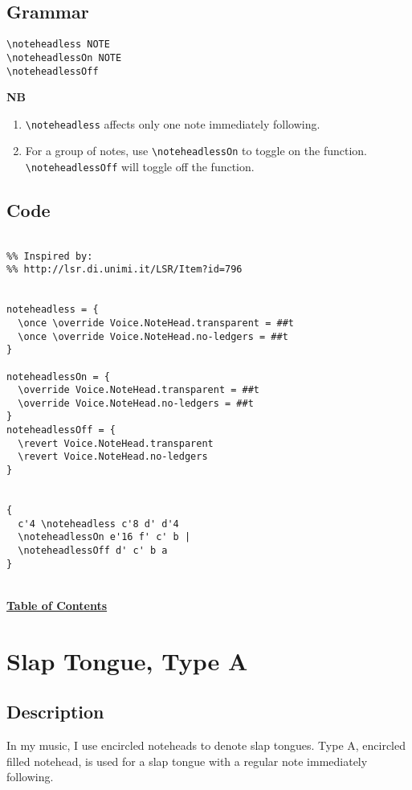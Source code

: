 \subsection{Grammar}
\begin{verbatim}
\noteheadless NOTE
\noteheadlessOn NOTE 
\noteheadlessOff
\end{verbatim}

\textbf{NB} 
\begin{enumerate} 
\item \verb|\noteheadless| affects only one note immediately following. 
\item For a group of notes, use \verb|\noteheadlessOn| to toggle on the function.  \verb|\noteheadlessOff| will toggle off the function.
\end{enumerate}

\subsection{Code}
\begin{verbatim}

%% Inspired by:
%% http://lsr.di.unimi.it/LSR/Item?id=796


noteheadless = {
  \once \override Voice.NoteHead.transparent = ##t
  \once \override Voice.NoteHead.no-ledgers = ##t
}

noteheadlessOn = {
  \override Voice.NoteHead.transparent = ##t
  \override Voice.NoteHead.no-ledgers = ##t
}
noteheadlessOff = {
  \revert Voice.NoteHead.transparent
  \revert Voice.NoteHead.no-ledgers
}


{
  c'4 \noteheadless c'8 d' d'4
  \noteheadlessOn e'16 f' c' b |
  \noteheadlessOff d' c' b a
}

\end{verbatim}
\hyperref[sec:toc]{\\ \textbf{Table of Contents}}

\vfill \break


\section {Slap Tongue, Type A}
\hfill

\subsection{Description}
	In my music, I use encircled noteheads to denote slap tongues. Type A, encircled filled notehead, is used for a slap tongue with a regular note immediately following. 
	
